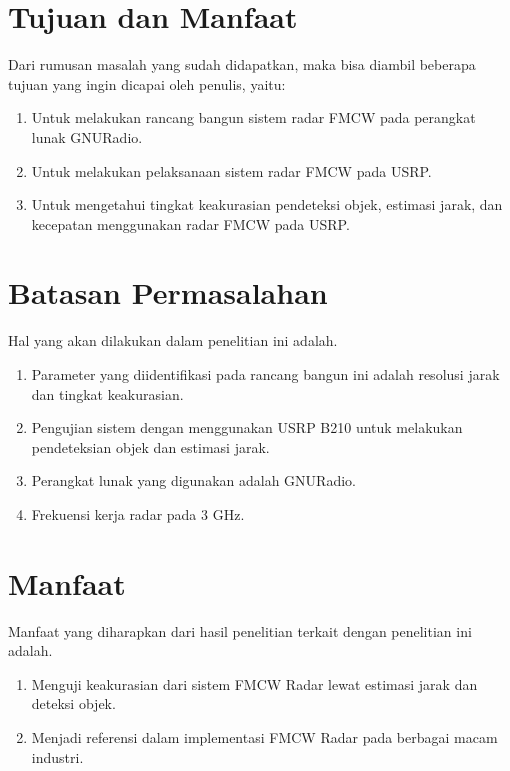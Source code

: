 \section{Tujuan dan Manfaat}
Dari rumusan masalah yang sudah didapatkan, maka bisa diambil beberapa tujuan yang ingin dicapai oleh penulis, yaitu:

\begin{enumerate}
	\item Untuk melakukan rancang bangun sistem radar FMCW pada perangkat lunak GNURadio.
	\item Untuk melakukan pelaksanaan sistem radar FMCW pada USRP.
	\item Untuk mengetahui tingkat keakurasian pendeteksi objek, estimasi jarak, dan kecepatan menggunakan radar FMCW pada USRP.
\end{enumerate}

\section{Batasan Permasalahan}
Hal yang akan dilakukan dalam penelitian ini adalah.
\begin{enumerate}
	\item Parameter yang diidentifikasi pada rancang bangun ini adalah resolusi jarak dan tingkat keakurasian.
	\item Pengujian sistem dengan menggunakan USRP B210 untuk melakukan pendeteksian objek dan estimasi jarak.
	\item Perangkat lunak yang digunakan adalah GNURadio.
	\item Frekuensi kerja radar pada 3 GHz.
\end{enumerate}

\section{Manfaat}
Manfaat yang diharapkan dari hasil penelitian terkait dengan penelitian ini adalah. 
\begin{enumerate}
	\item Menguji keakurasian dari sistem FMCW Radar lewat estimasi jarak dan deteksi objek.
	\item Menjadi referensi dalam implementasi FMCW Radar pada berbagai macam industri.
\end{enumerate}


